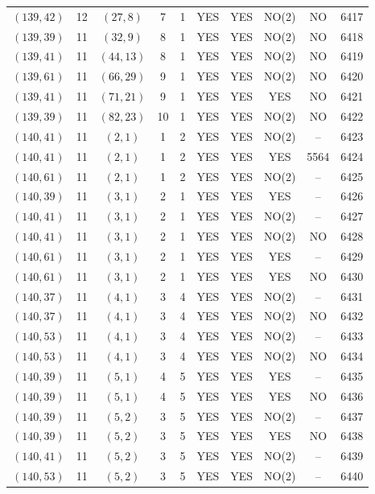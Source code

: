 \begin{longtable}{|c|c|c|c|c|c|c|c|c|c|}
$(139, 42)$ & 12 & $(27, 8)$ & 7 & 1 & YES & YES & NO(2) & NO & 6417\\
$(139, 39)$ & 11 & $(32, 9)$ & 8 & 1 & YES & YES & NO(2) & NO & 6418\\
$(139, 41)$ & 11 & $(44, 13)$ & 8 & 1 & YES & YES & NO(2) & NO & 6419\\
$(139, 61)$ & 11 & $(66, 29)$ & 9 & 1 & YES & YES & NO(2) & NO & 6420\\
$(139, 41)$ & 11 & $(71, 21)$ & 9 & 1 & YES & YES & YES & NO & 6421\\
$(139, 39)$ & 11 & $(82, 23)$ & 10 & 1 & YES & YES & NO(2) & NO & 6422\\
$(140, 41)$ & 11 & $(2, 1)$ & 1 & 2 & YES & YES & NO(2) & -- & 6423\\
$(140, 41)$ & 11 & $(2, 1)$ & 1 & 2 & YES & YES & YES & 5564 & 6424\\
$(140, 61)$ & 11 & $(2, 1)$ & 1 & 2 & YES & YES & NO(2) & -- & 6425\\
$(140, 39)$ & 11 & $(3, 1)$ & 2 & 1 & YES & YES & YES & -- & 6426\\
$(140, 41)$ & 11 & $(3, 1)$ & 2 & 1 & YES & YES & NO(2) & -- & 6427\\
$(140, 41)$ & 11 & $(3, 1)$ & 2 & 1 & YES & YES & NO(2) & NO & 6428\\
$(140, 61)$ & 11 & $(3, 1)$ & 2 & 1 & YES & YES & YES & -- & 6429\\
$(140, 61)$ & 11 & $(3, 1)$ & 2 & 1 & YES & YES & YES & NO & 6430\\
$(140, 37)$ & 11 & $(4, 1)$ & 3 & 4 & YES & YES & NO(2) & -- & 6431\\
$(140, 37)$ & 11 & $(4, 1)$ & 3 & 4 & YES & YES & NO(2) & NO & 6432\\
$(140, 53)$ & 11 & $(4, 1)$ & 3 & 4 & YES & YES & NO(2) & -- & 6433\\
$(140, 53)$ & 11 & $(4, 1)$ & 3 & 4 & YES & YES & NO(2) & NO & 6434\\
$(140, 39)$ & 11 & $(5, 1)$ & 4 & 5 & YES & YES & YES & -- & 6435\\
$(140, 39)$ & 11 & $(5, 1)$ & 4 & 5 & YES & YES & YES & NO & 6436\\
$(140, 39)$ & 11 & $(5, 2)$ & 3 & 5 & YES & YES & NO(2) & -- & 6437\\
$(140, 39)$ & 11 & $(5, 2)$ & 3 & 5 & YES & YES & YES & NO & 6438\\
$(140, 41)$ & 11 & $(5, 2)$ & 3 & 5 & YES & YES & NO(2) & -- & 6439\\
$(140, 53)$ & 11 & $(5, 2)$ & 3 & 5 & YES & YES & NO(2) & -- & 6440\\

\end{longtable}
